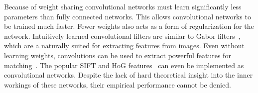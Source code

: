     Because of weight sharing convolutional networks must learn
      significantly less parameters than fully connected networks.
    This allows convolutional networks to be trained much faster.
    Fewer weights also acts as a form of regularization for the
      network.
    Intuitively learned convolutional filters are similar to Gabor
      filters~\cite{gabor_theory_1946}, which are a naturally suited for
      extracting features from images.
    Even without learning weights, convolutions can be used to extract
      powerful features for matching~\cite{revaud_deep_2015}.
    The popular SIFT and HoG
      features~\cite{mahendran_understanding_2014} can even be
      implemented as convolutional networks.
    Despite the lack of hard theoretical insight into the inner
      workings of these networks, their empirical performance cannot be
      denied.



